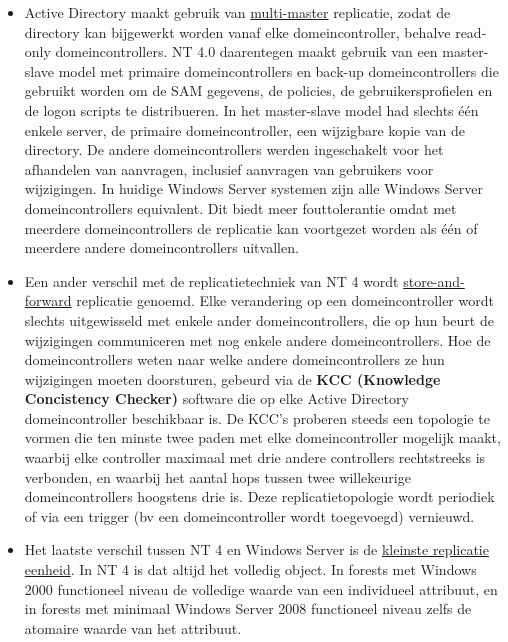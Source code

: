 \documentclass{report}
\begin{document}
\begin{enumerate}
		 { 
			\begin{itemize}
				\item Active Directory maakt gebruik van \underline{multi-master} replicatie, zodat de directory kan bijgewerkt worden vanaf elke domeincontroller, behalve read-only domeincontrollers. NT 4.0 daarentegen maakt gebruik van een master-slave model met primaire domeincontrollers en back-up domeincontrollers die gebruikt worden om de SAM gegevens, de policies, de gebruikersprofielen en de logon scripts te distribueren. In het master-slave model had slechts één enkele server, de primaire domeincontroller, een wijzigbare kopie van de directory. De andere domeincontrollers werden ingeschakelt voor het afhandelen van aanvragen, inclusief aanvragen van gebruikers voor wijzigingen. In huidige Windows Server systemen zijn alle Windows Server domeincontrollers equivalent. Dit biedt meer fouttolerantie omdat met meerdere domeincontrollers de replicatie kan voortgezet worden als één of meerdere andere domeincontrollers uitvallen. 
				\item Een ander verschil met de replicatietechniek van NT 4 wordt \underline{store-and-forward} replicatie genoemd. Elke verandering op een domeincontroller wordt slechts uitgewisseld met enkele ander domeincontrollers, die op hun beurt de wijzigingen communiceren met nog enkele andere domeincontrollers. Hoe de domeincontrollers weten naar welke andere domeincontrollers ze hun wijzigingen moeten doorsturen, gebeurd via de \textbf{KCC (Knowledge Concistency Checker)} software die op elke Active Directory domeincontroller beschikbaar is. De KCC's proberen steeds een topologie te vormen die ten minste twee paden met elke domeincontroller mogelijk maakt, waarbij elke controller maximaal met drie andere controllers rechtstreeks is verbonden, en waarbij het aantal hops tussen twee willekeurige domeincontrollers hoogstens drie is. Deze replicatietopologie wordt periodiek of via een trigger (bv een domeincontroller wordt toegevoegd) vernieuwd. 
				\item Het laatste verschil tussen NT 4 en Windows Server is de \underline{kleinste replicatie eenheid}. In NT 4 is dat altijd het volledig object. In forests met Windows 2000 functioneel niveau de volledige waarde van een individueel attribuut, en in forests met minimaal Windows Server 2008 functioneel niveau zelfs de atomaire waarde van het attribuut. 

\end{itemize}}
\end{enumerate}
\end{document}
